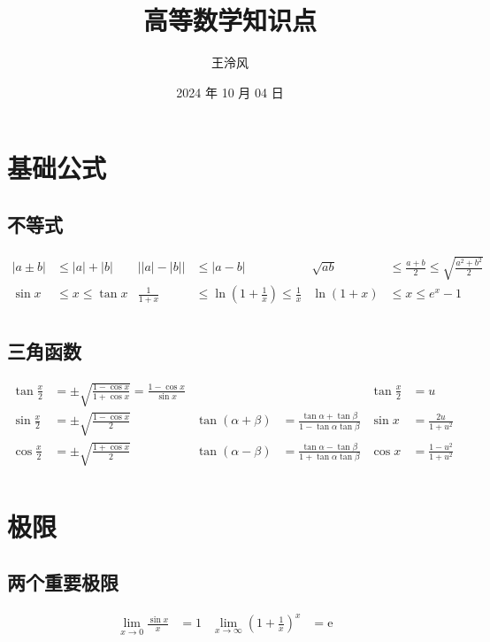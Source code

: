 ﻿\documentclass[a4paper,12pt,UTF8]{ctexart}
\begin{document}
    \title{高等数学知识点}
    \author{王泠风}
    \date{2024 年 10 月 04 日}
    \maketitle

    \section{基础公式}
    
    \subsection{不等式}
    \begin{align*}
        \left| a\pm b \right|& \leq \left| a \right| + \left| b \right|& \left| \left| a \right| - \left| b \right| \right|& \leq \left| a-b \right|& \sqrt{ab}& \leq \frac{a+b}{2} \leq \sqrt{\frac{a^2+b^2}{2}}&\\
        \sin x& \leq x \leq \tan x& \frac{1}{1+x}& \leq \ln \left( 1+\frac{1}{x} \right) \leq \frac{1}{x}& \ln \left( 1+x \right)& \leq x \leq e^x-1&\\
    \end{align*}

    \subsection{三角函数}
    \begin{align*}
        \tan \frac{x}{2}& = \pm \sqrt{\frac{1-\cos x}{1+\cos x}} = \frac{1-\cos x}{\sin x}& && \tan \frac{x}{2}& = u&\\
        \sin \frac{x}{2}& = \pm \sqrt{\frac{1-\cos x}{2}}& \tan (\alpha + \beta)& = \frac{\tan \alpha + \tan \beta}{1 - \tan \alpha \tan \beta}& \sin x& = \frac{2u}{1+u^{2}}&\\
        \cos \frac{x}{2}& = \pm \sqrt{\frac{1+\cos x}{2}}& \tan (\alpha - \beta)& = \frac{\tan \alpha - \tan \beta}{1 + \tan \alpha \tan \beta}& \cos x& = \frac{1-u^{2}}{1+u^{2}}&\\
    \end{align*}

    \section{极限}

    \subsection{两个重要极限}
    \begin{align*}
        \lim_{x\to 0}\frac{\sin x}{x}& = 1& \lim_{x\to\infty}\left(1+\frac{1}{x}\right)^x& = \mathrm{e}&\\
    \end{align*}
    
\end{document}
